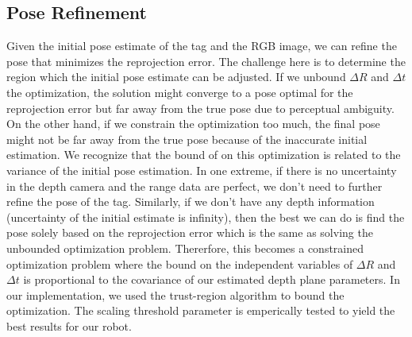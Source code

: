 \subsection{Pose Refinement}
Given the initial pose estimate of the tag and the RGB image, we can refine the pose that minimizes the reprojection error. The challenge here is to determine the region which the initial pose estimate can be adjusted. If we unbound $\Delta R$ and $\Delta t$ the optimization, the solution might converge to a pose optimal for the reprojection error but far away from the true pose due to perceptual ambiguity. On the other hand, if we constrain the optimization too much, the final pose might not be far away from the true pose because of the inaccurate initial estimation. We recognize that the bound of on this optimization is related to the variance of the initial pose estimation. In one extreme, if there is no uncertainty in the depth camera and the range data are perfect, we don't need to further refine the pose of the tag. Similarly, if we don't have any depth information (uncertainty of the initial estimate is infinity), then the best we can do is find the pose solely based on the reprojection error which is the same as solving the unbounded optimization problem. Thererfore, this becomes a constrained optimization problem where the bound on the independent variables of $\Delta R$ and $\Delta t$ is proportional to the covariance of our estimated depth plane parameters. In our implementation, we used the trust-region algorithm to bound the optimization. The scaling threshold parameter is emperically tested to yield the best results for our robot. 